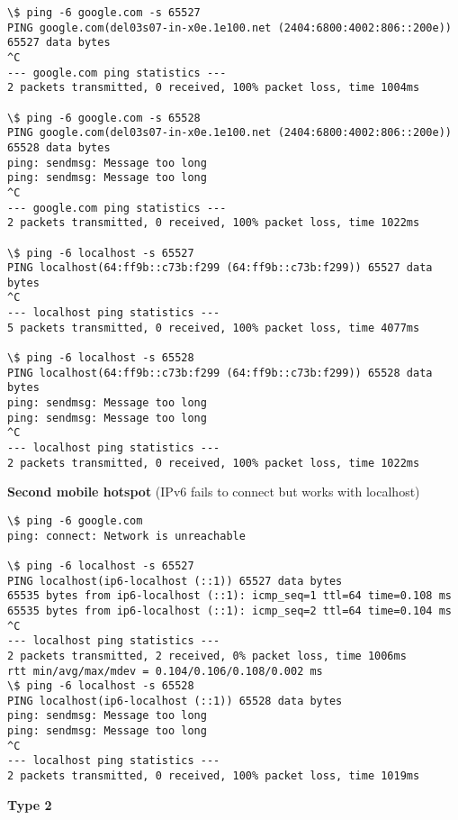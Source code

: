 \documentclass[a4paper]{article}
\newcommand{\nl}{\vspace{0.2cm}\\}
\newcommand{\nln}{\vspace{0.2cm}}
\begin{document}
\begin{lstlisting}
\$ ping -6 google.com -s 65527
PING google.com(del03s07-in-x0e.1e100.net (2404:6800:4002:806::200e)) 65527 data bytes
^C
--- google.com ping statistics ---
2 packets transmitted, 0 received, 100% packet loss, time 1004ms

\$ ping -6 google.com -s 65528
PING google.com(del03s07-in-x0e.1e100.net (2404:6800:4002:806::200e)) 65528 data bytes
ping: sendmsg: Message too long
ping: sendmsg: Message too long
^C
--- google.com ping statistics ---
2 packets transmitted, 0 received, 100% packet loss, time 1022ms

\$ ping -6 localhost -s 65527
PING localhost(64:ff9b::c73b:f299 (64:ff9b::c73b:f299)) 65527 data bytes
^C
--- localhost ping statistics ---
5 packets transmitted, 0 received, 100% packet loss, time 4077ms

\$ ping -6 localhost -s 65528
PING localhost(64:ff9b::c73b:f299 (64:ff9b::c73b:f299)) 65528 data bytes
ping: sendmsg: Message too long
ping: sendmsg: Message too long
^C
--- localhost ping statistics ---
2 packets transmitted, 0 received, 100% packet loss, time 1022ms
\end{lstlisting}
\nln

\textbf{Second mobile hotspot} (IPv6 fails to connect but works with localhost)

\begin{lstlisting}
\$ ping -6 google.com
ping: connect: Network is unreachable

\$ ping -6 localhost -s 65527
PING localhost(ip6-localhost (::1)) 65527 data bytes
65535 bytes from ip6-localhost (::1): icmp_seq=1 ttl=64 time=0.108 ms
65535 bytes from ip6-localhost (::1): icmp_seq=2 ttl=64 time=0.104 ms
^C
--- localhost ping statistics ---
2 packets transmitted, 2 received, 0% packet loss, time 1006ms
rtt min/avg/max/mdev = 0.104/0.106/0.108/0.002 ms
\$ ping -6 localhost -s 65528
PING localhost(ip6-localhost (::1)) 65528 data bytes
ping: sendmsg: Message too long
ping: sendmsg: Message too long
^C
--- localhost ping statistics ---
2 packets transmitted, 0 received, 100% packet loss, time 1019ms
\end{lstlisting}
\nln

\textbf{Type 2}\nl
\end{document}
